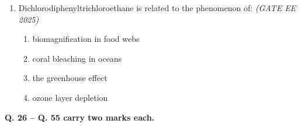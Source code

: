 \documentclass[11pt,a4paper]{article}
\begin{document}
\begin{enumerate}[leftmargin=*,label=\textbf{Q.\arabic*},resume]
\item Dichlorodiphenyltrichloroethane is related to the phenomenon of: \hfill \textit{(GATE EE 2025)}
\begin{multicols}{2}
\begin{enumerate}[label=(\Alph*)]
\item biomagnification in food webs
\item coral bleaching in oceans
\item the greenhouse effect
\item ozone layer depletion
\end{enumerate}
\end{multicols}

\end{enumerate}
\newpage
{}

\noindent \textbf{Q. 26 -- Q. 55 carry two marks each.}
\end{document}
